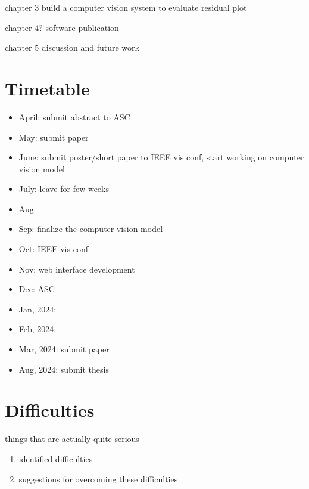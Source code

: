 \documentclass[11pt,a4paper,]{article}
\providecommand{\tightlist}{%
  \setlength{\itemsep}{0pt}\setlength{\parskip}{0pt}}
\begin{document}
chapter 3
build a computer vision system to evaluate residual plot

chapter 4?
software publication

chapter 5
discussion and future work

\hypertarget{timetable}{%
\section{Timetable}\label{timetable}}

\begin{itemize}
\item
  April: submit abstract to ASC
\item
  May: submit paper
\item
  June: submit poster/short paper to IEEE vis conf, start working on computer vision model
\item
  July: leave for few weeks
\item
  Aug
\item
  Sep: finalize the computer vision model
\item
  Oct: IEEE vis conf
\item
  Nov: web interface development
\item
  Dec: ASC
\item
  Jan, 2024:
\item
  Feb, 2024:
\item
  Mar, 2024: submit paper
\item
  Aug, 2024: submit thesis
\end{itemize}

\hypertarget{difficulties}{%
\section{Difficulties}\label{difficulties}}

things that are actually quite serious

\begin{enumerate}
\def\labelenumi{\arabic{enumi}.}
\tightlist
\item
  identified difficulties
\item
  suggestions for overcoming these difficulties
\end{enumerate}

\printbibliography[title=References]
\end{document}

